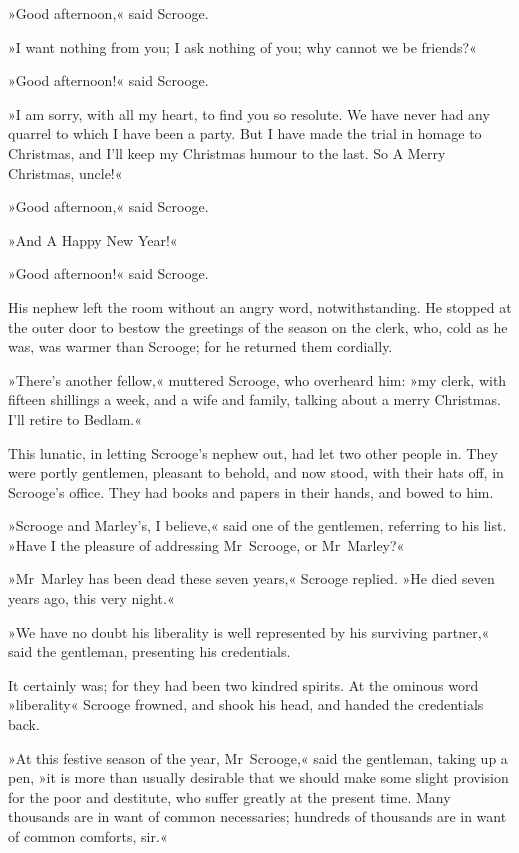 »Good afternoon,« said Scrooge.

»I want nothing from you; I ask nothing of you; why cannot we be friends?«

»Good afternoon!« said Scrooge.

»I am sorry, with all my heart, to find you so resolute. We have never had any quarrel to which I have been a party. But I have made the trial in homage to Christmas, and I'll keep my Christmas humour to the last. So A Merry Christmas, uncle!«

»Good afternoon,« said Scrooge.

»And A Happy New Year!«

»Good afternoon!« said Scrooge.

His nephew left the room without an angry word, notwithstanding. He stopped at the outer door to bestow the greetings of the season on the clerk, who, cold as he was, was warmer than Scrooge; for he returned them cordially.

»There's another fellow,« muttered Scrooge, who overheard him: »my clerk, with fifteen shillings a week, and a wife and family, talking about a merry Christmas. I'll retire to Bedlam.«

This lunatic, in letting Scrooge's nephew out, had let two other people in. They were portly gentlemen, pleasant to behold, and now stood, with their hats off, in Scrooge's office. They had books and papers in their hands, and bowed to him.

»Scrooge and Marley's, I believe,« said one of the gentlemen, referring to his list. »Have I the pleasure of addressing Mr~Scrooge, or Mr~Marley?«

»Mr~Marley has been dead these seven years,« Scrooge replied. »He died seven years ago, this very night.«

»We have no doubt his liberality is well represented by his surviving partner,« said the gentleman, presenting his credentials.

It certainly was; for they had been two kindred spirits. At the ominous word »liberality« Scrooge frowned, and shook his head, and handed the credentials back.

»At this festive season of the year, Mr~Scrooge,« said the gentleman, taking up a pen, »it is more than usually desirable that we should make some slight provision for the poor and destitute, who suffer greatly at the present time. Many thousands are in want of common necessaries; hundreds of thousands are in want of common comforts, sir.«

